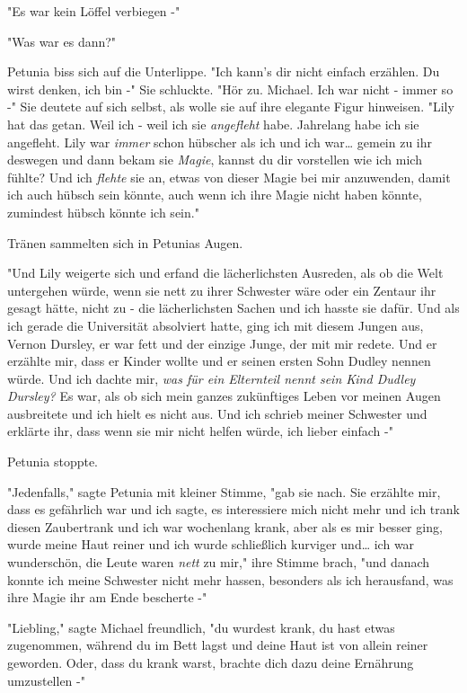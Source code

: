{"Es war kein Löffel verbiegen -"

"Was war es dann?"

Petunia biss sich auf die Unterlippe. "Ich kann's dir nicht einfach erzählen. Du wirst denken, ich bin -" Sie schluckte. "Hör zu. Michael. Ich war nicht - immer so -" Sie deutete auf sich selbst, als wolle sie auf ihre elegante Figur hinweisen. "Lily hat das getan. Weil ich - weil ich sie \emph{angefleht} habe. Jahrelang habe ich sie angefleht. Lily war \emph{immer} schon hübscher als ich und ich war… gemein zu ihr deswegen und dann bekam sie \emph{Magie}, kannst du dir vorstellen wie ich mich fühlte? Und ich \emph{flehte} sie an, etwas von dieser Magie bei mir anzuwenden, damit ich auch hübsch sein könnte, auch wenn ich ihre Magie nicht haben könnte, zumindest hübsch könnte ich sein."

Tränen sammelten sich in Petunias Augen.

"Und Lily weigerte sich und erfand die lächerlichsten Ausreden, als ob die Welt untergehen würde, wenn sie nett zu ihrer Schwester wäre oder ein Zentaur ihr gesagt hätte, nicht zu - die lächerlichsten Sachen und ich hasste sie dafür. Und als ich gerade die Universität absolviert hatte, ging ich mit diesem Jungen aus, Vernon Dursley, er war fett und der einzige Junge, der mit mir redete. Und er erzählte mir, dass er Kinder wollte und er seinen ersten Sohn Dudley nennen würde. Und ich dachte mir, \emph{was für ein Elternteil nennt sein Kind Dudley Dursley?} Es war, als ob sich mein ganzes zukünftiges Leben vor meinen Augen ausbreitete und ich hielt es nicht aus. Und ich schrieb meiner Schwester und erklärte ihr, dass wenn sie mir nicht helfen würde, ich lieber einfach -"

Petunia stoppte.

"Jedenfalls," sagte Petunia mit kleiner Stimme, "gab sie nach. Sie erzählte mir, dass es gefährlich war und ich sagte, es interessiere mich nicht mehr und ich trank diesen Zaubertrank und ich war wochenlang krank, aber als es mir besser ging, wurde meine Haut reiner und ich wurde schließlich kurviger und… ich war wunderschön, die Leute waren \emph{nett} zu mir," ihre Stimme brach, "und danach konnte ich meine Schwester nicht mehr hassen, besonders als ich herausfand, was ihre Magie ihr am Ende bescherte -"

"Liebling," sagte Michael freundlich, "du wurdest krank, du hast etwas zugenommen, während du im Bett lagst und deine Haut ist von allein reiner geworden. Oder, dass du krank warst, brachte dich dazu deine Ernährung umzustellen -"

}
